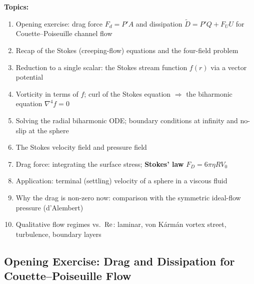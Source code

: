 \documentclass[../main.tex]{subfiles}
\begin{document}
\medskip\noindent\textbf{Topics:}
\begin{enumerate}
  \item Opening exercise: drag force $F_d=P'A$ and dissipation $\tilde{D}=P'Q+F_U U$ for Couette--Poiseuille channel flow
  \item Recap of the Stokes (creeping-flow) equations and the four-field problem
  \item Reduction to a single scalar: the Stokes stream function $f(r)$ via a vector potential
  \item Vorticity in terms of $f$; curl of the Stokes equation $\Rightarrow$ the biharmonic equation $\nabla^4 f=0$
  \item Solving the radial biharmonic ODE; boundary conditions at infinity and no-slip at the sphere
  \item The Stokes velocity field and pressure field
  \item Drag force: integrating the surface stress; \textbf{Stokes' law} $F_D=6\pi\eta RV_0$
  \item Application: terminal (settling) velocity of a sphere in a viscous fluid
  \item Why the drag is non-zero now: comparison with the symmetric ideal-flow pressure (d'Alembert)
  \item Qualitative flow regimes vs.\ $\mathrm{Re}$: laminar, von Kármán vortex street, turbulence, boundary layers
\end{enumerate}

\subsection{Opening Exercise: Drag and Dissipation for Couette--Poiseuille Flow}\label{sec:lec21:exercise}
\end{document}
